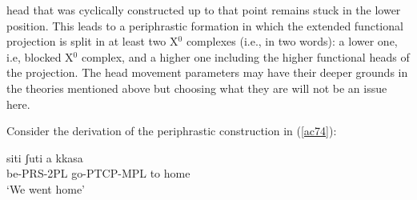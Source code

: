 \documentclass[output=paper]{langscibook}
\begin{document}
head that was cyclically constructed up to that point remains stuck in the lower position. This leads to a periphrastic formation in which the extended functional projection is split in at least two X$^0$ complexes (i.e., in two words): a lower one, i.e, blocked X$^0$ complex, and a higher one including the higher functional heads of the projection. The head movement parameters may have their deeper grounds in the theories mentioned above but choosing what they are will not be an issue here.
 
Consider the derivation of the periphrastic construction in (\ref{ac74}):

\ea \label{ac74}\gll siti    ʃuti        a   kkasa\\
   be-PRS-2PL  go-PTCP-MPL  to  home\\
   \glt ‘We went home’
\z
\end{document}
